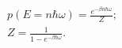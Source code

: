 \begin{texcode}[basicstyle=\scriptsize\ttfamily, emph={[1]gather,gather*}]
  \begin{gather*}
  p(E = n\hbar\omega) =
  \frac{e^{−\beta n\hbar\omega}}{Z}; \\
  Z = \frac{1}{1−e^{−\beta\hbar\omega}}.
  \end{gather*}
\end{texcode}
